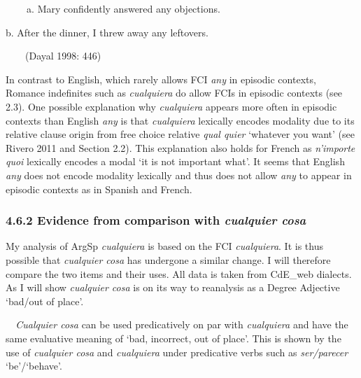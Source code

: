 \begin{styleStandard}
\textbf{\ \ }\ \ a. Mary confidently answered any objections.
\end{styleStandard}

\begin{styleStandard}
b. After the dinner, I threw away any leftovers. 
\end{styleStandard}

\begin{styleStandard}
\ \ \ \ (Dayal 1998: 446)
\end{styleStandard}

\begin{styleStandard}
In contrast to English, which rarely allows FCI \textit{any} in episodic contexts, Romance indefinites such as \textit{cualquiera} do allow FCIs in episodic contexts (see 2.3). One possible explanation why \textit{cualquiera} appears more often in episodic contexts than English \textit{any} is that \textit{cualquiera} lexically encodes modality due to its relative clause origin from free choice relative \textit{qual quier} ‘whatever you want’ (see Rivero 2011 and Section 2.2). This explanation also holds for French as \textit{n’importe quoi} lexically encodes a modal ‘it is not important what’. It seems that English \textit{any} does not encode modality lexically and thus does not allow \textit{any} to appear in episodic contexts as in Spanish and French. 
\end{styleStandard}

\subsubsection[4.6.2 Evidence from comparison with cualquier cosa]{\textbf{4.6.2 Evidence from comparison with }\textbf{\textit{cualquier cosa}}}
\begin{styleStandard}
My analysis of ArgSp \textit{cualquiera} is based on the FCI \textit{cualquiera}. It is thus possible that \textit{cualquier cosa} has undergone a similar change. I will therefore compare the two items and their uses. All data is taken from CdE\_web dialects. As I will show \textit{cualquier cosa} is on its way to reanalysis as a Degree Adjective ‘bad/out of place’. 
\end{styleStandard}

\begin{styleStandard}
\textit{\ \ Cualquier cosa} can be used predicatively on par with \textit{cualquiera} and have the same evaluative meaning of ‘bad, incorrect, out of place’. This is shown by the use of \textit{cualquier cosa }and \textit{cualquiera} under predicative verbs such as \textit{ser/parecer} ‘be’/‘behave’.
\end{styleStandard}

